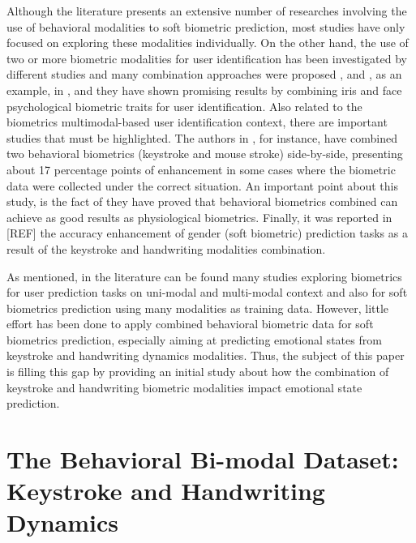 \documentclass[conference]{IEEEtran}
\begin{document}
Although the literature presents an extensive number of researches involving the use of behavioral modalities to soft biometric prediction, most studies have only focused on exploring these modalities individually. On the other hand, the use of two or more biometric modalities for user identification has been investigated by different studies and many combination approaches were proposed \cite{multimodal-biometrics}, \cite{multibiometric} and \cite{handbook-multibiometrics}, as an example, in \cite{face-iris-comb},  and they have shown promising results by combining iris and face psychological biometric traits for user identification. 
Also related to the biometrics multimodal-based user identification context, there are important studies that must be highlighted. The authors in \cite{marjorie-comb}, for instance, have combined two behavioral biometrics (keystroke and mouse stroke) side-by-side, presenting about 17 percentage points of enhancement in some cases where the biometric data were collected under the correct situation. An important point about this study, is the fact of they have proved that behavioral biometrics combined can achieve as good results as physiological biometrics.
Finally, it was reported in [REF] the accuracy enhancement of gender (soft biometric) prediction tasks as a result of the keystroke and handwriting modalities combination.

As mentioned, in the literature can be found many studies exploring biometrics for user prediction tasks on uni-modal and multi-modal context and also for soft biometrics prediction using many modalities as training data.
However, little effort has been done to apply combined behavioral biometric data for soft biometrics prediction, especially aiming at predicting emotional states from keystroke and handwriting dynamics modalities. Thus, the subject of this paper is filling this gap by providing an initial study about how the combination of keystroke and handwriting biometric modalities impact emotional state prediction.



\section{The Behavioral Bi-modal Dataset: Keystroke and Handwriting Dynamics}
\label{dataset}
\end{document}
